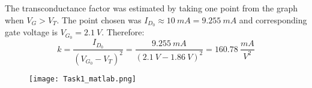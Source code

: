 The transconductance factor was estimated by taking one point from the graph when $V_G > V_T$. The point chosen was $I_{D_0} \approx 10 \ mA = 9.255 \ mA $ and corresponding gate voltage is $V_{G_0} = 2.1 \ V$. Therefore: $$ k = \dfrac{I_{D_0}}{(V_{G_0}-V_T)^2} = \dfrac{9.255 \ mA}{(2.1 \ V - 1.86 \ V)^2} = 160.78 \ \dfrac{mA}{V^2} $$

\begin{figure}[h!]
        \centering
        \texttt{[image: Task1\_matlab.png]}
\end{figure}

